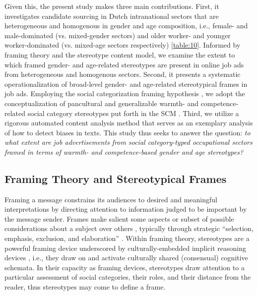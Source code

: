 \documentclass[man]{apa7}
\begin{document}
Given this, the present study makes three main contributions. First, it investigates candidate sourcing in Dutch intranational sectors that are heterogeneous and homogenous in gender and age composition, i.e., female- and male-dominated (vs. mixed-gender sectors) and older worker- and younger worker-dominated (vs. mixed-age sectors respectively) \ref{table:10}. Informed by framing theory and the stereotype content model, we examine the extent to which framed gender- and age-related stereotypes are present in online job ads from heterogeneous and homogenous sectors. Second, it presents a systematic operationalization of broad-level gender- and age-related stereotypical frames in job ads. Employing the social categorization framing hypothesis \parencite{Yang2015a}, we adopt the conceptualization of pancultural and generalizable warmth- and competence-related social category stereotypes put forth in the SCM \parencite{fiske_model_2002}. Third, we utilize a rigorous automated content analysis method that serves as an exemplary analysis of how to detect biases in texts. This study thus seeks to answer the question: \textit{to what extent are job advertisements from social category-typed occupational sectors framed in terms of warmth- and competence-based gender and age stereotypes?}

\subsection{Framing Theory and Stereotypical Frames}
\label{framing}
Framing a message constrains its audiences to desired and meaningful interpretations by directing attention to information judged to be important by the message sender. Frames make salient some aspects or subset of possible considerations about a subject over others \parencite{entman_framing_1993}, typically through strategic “selection, emphasis, exclusion, and elaboration” \parencite[p. 10] {reese_framing_2001}. Within framing theory, stereotypes are a powerful framing device underscored by culturally-embedded implicit reasoning devices \parencite{van_gorp_where_2005}, i.e., they draw on and activate culturally shared (consensual) cognitive schemata. In their capacity as framing devices, stereotypes draw attention to a particular assessment of social categories, their roles, and their distance from the reader, thus stereotypes may come to define a frame.
\end{document}
